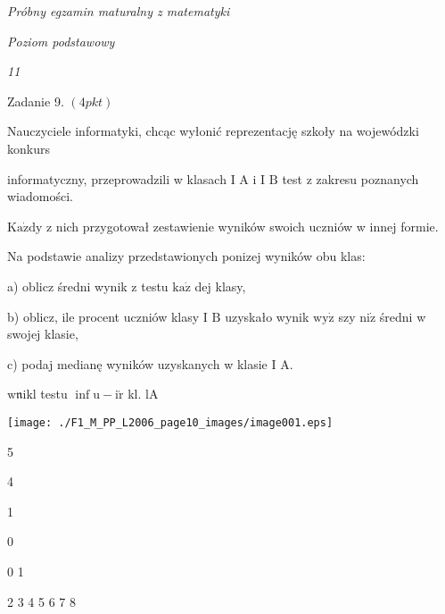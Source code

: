 \documentclass[a4paper,12pt]{article}
\begin{document}
{\it Próbny egzamin maturalny z matematyki}

{\it Poziom podstawowy}

{\it 11}

Zadanie 9. $(4pkt)$

Nauczyciele informatyki, chcąc wyłonić reprezentację szkoły na wojewódzki konkurs

informatyczny, przeprowadzili w klasach I A i I $\mathrm{B}$ test z zakresu poznanych wiadomości.

$\mathrm{K}\mathrm{a}\dot{\mathrm{z}}\mathrm{d}\mathrm{y}$ z nich przygotował zestawienie wyników swoich uczniów w innej formie.

Na podstawie analizy przedstawionych ponizej wyników obu klas:

a) oblicz średni wynik z testu $\mathrm{k}\mathrm{a}\dot{\mathrm{z}}$ dej klasy,

b) oblicz, ile procent uczniów klasy I $\mathrm{B}$ uzyskało wynik $\mathrm{w}\mathrm{y}\dot{\mathrm{z}}$ szy $\mathrm{n}\mathrm{i}\dot{\mathrm{z}}$ średni w swojej klasie,

c) podaj medianę wyników uzyskanych w klasie I A.

$\mathrm{w}\mathfrak{n}\mathrm{i}\mathrm{k}\mathrm{l}$ testu $\displaystyle \inf \mathrm{u}-\mathrm{i}\acute{\mathrm{r}}$ kl. lA
\begin{center}
\texttt{[image: ./F1\_M\_PP\_L2006\_page10\_images/image001.eps]}
\end{center}
5

4

1

0

0 1

2 3 4 5 6 7 8
\end{document}
